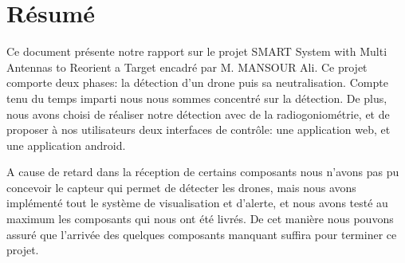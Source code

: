 
\chapter*{Résumé}




Ce document présente notre rapport sur le projet SMART \og System with Multi Antennas to Reorient a Target\fg{} encadré  par M. MANSOUR Ali. Ce projet comporte deux phases: la détection d'un drone puis sa neutralisation. Compte tenu du  temps imparti nous nous sommes concentré sur la détection. De plus, nous avons choisi de réaliser notre détection avec de la radiogoniométrie, et de proposer à nos utilisateurs deux interfaces de contrôle: une application web, et une application android.


A cause de retard dans la réception de certains composants nous n'avons pas pu concevoir le capteur qui permet de détecter les drones, mais nous avons implémenté tout le système de visualisation et d'alerte, et nous avons testé au maximum les composants qui nous ont été livrés. De cet manière nous pouvons assuré que l'arrivée des quelques composants manquant suffira pour terminer ce projet. ~\\






